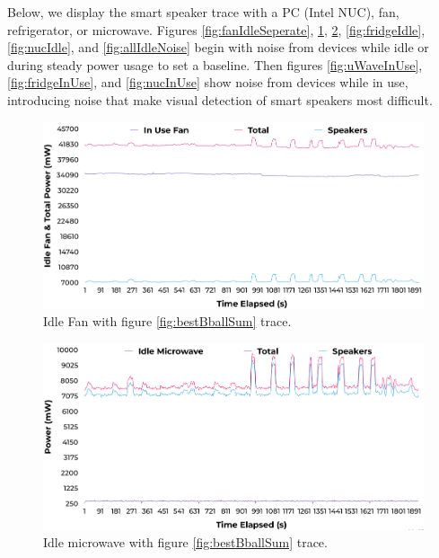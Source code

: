 Below, we display the smart speaker trace with a PC (Intel NUC), fan, refrigerator, or microwave. Figures \ref{fig:fanIdleSeperate}, \ref{fig:fanIdle}, \ref{fig:uWaveIdle}, \ref{fig:fridgeIdle}, \ref{fig:nucIdle}, and \ref{fig:allIdleNoise} begin with noise from devices while idle or during steady power usage to set a baseline. Then figures \ref{fig:uWaveInUse}, \ref{fig:fridgeInUse}, and \ref{fig:nucInUse} show noise from devices while in use, introducing noise that make visual detection of smart speakers most difficult.

\begin{figure}[H]
  \centering
  \includegraphics[width=1\textwidth]{figures/inUseFanNoise.png}
  \caption{Idle Fan with figure \ref{fig:bestBballSum} trace.}
  \label{fig:fanIdle}
\end{figure}

\begin{figure}[H]
  \centering
  \includegraphics[width=1\textwidth]{figures/idleuWaveNoise.png}
  \caption{Idle microwave with figure \ref{fig:bestBballSum} trace.}
  \label{fig:uWaveIdle}
\end{figure}

